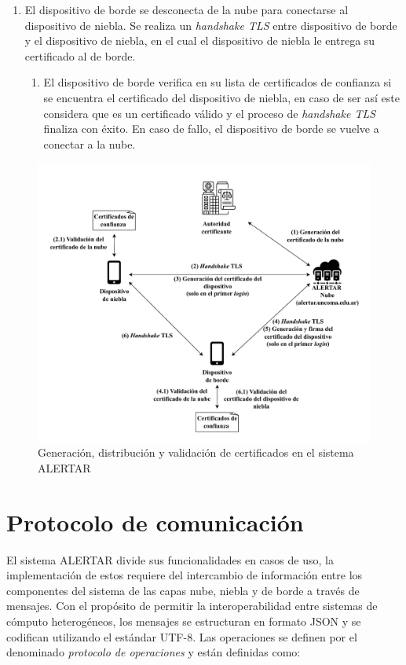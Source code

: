 \begin{enumerate}
    \item El dispositivo de borde se desconecta de la nube para conectarse al dispositivo de niebla. Se realiza un \textit{handshake TLS} entre dispositivo de borde y el dispositivo de niebla, en el cual el dispositivo de niebla le entrega su certificado al de borde.
    \begin{enumerate}[6.1]
        \item El dispositivo de borde verifica en su lista de certificados de confianza si se encuentra el certificado del dispositivo de niebla, en caso de ser así este considera que es un certificado válido y el proceso de \textit{handshake TLS} finaliza con éxito. En caso de fallo, el dispositivo de borde se vuelve a conectar a la nube.
    \end{enumerate}
\end{enumerate}



\begin{figure}
    \centering
    \includegraphics[width=\textwidth]{Imagenes/Implementacion/distribucionClaves.pdf}
    \caption{Generación, distribución y validación de certificados en el sistema ALERTAR}
    \label{fig:distClavesALERTAR}
\end{figure}

\section{Protocolo de comunicación}
\label{sec:protocoloComunicacion}
El sistema ALERTAR divide sus funcionalidades en casos de uso, la implementación de estos requiere del intercambio de información entre los componentes del sistema de las capas nube, niebla y de borde a través de mensajes. Con el propósito de permitir la interoperabilidad entre sistemas de cómputo heterogéneos, los mensajes se estructuran en formato JSON \cite{json_es} y se codifican utilizando el estándar UTF-8. Las operaciones se definen por el denominado \textit{protocolo de operaciones} y están definidas como:

